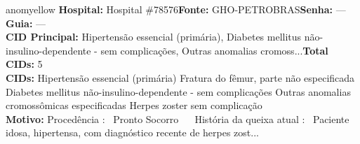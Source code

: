 \documentclass[a4paper,10pt]{article}
\begin{document}
\begin{anomalycard}[Interna\c{c}\~{a}o \#167734 | Pac. \#32192 | MODERADO (z=2.26) | LOS: 18d | 05/03/2026\,$\to$\,—]{anomyellow}
\textbf{Hospital:} Hospital \#78576\quad \textbf{Fonte:} GHO-PETROBRAS\quad \textbf{Senha:} ---\quad \textbf{Guia:} ---\\

\textbf{CID Principal:} {\small Hipertensão essencial (primária), Diabetes mellitus não-insulino-dependente - sem complicações, Outras anomalias cromoss...}\quad\textbf{Total CIDs:} 5\\

\textbf{CIDs:} {\scriptsize Hipertensão essencial (primária) \textbar{} Fratura do fêmur, parte não especificada \textbar{} Diabetes mellitus não-insulino-dependente - sem complicações \textbar{} Outras anomalias cromossômicas especificadas \textbar{} Herpes zoster sem complicação}\\

\textbf{Motivo:} {\scriptsize Procedência :  Pronto Socorro     História da queixa atual :  Paciente idosa, hipertensa, com diagnóstico recente de herpes zost...}\\




\end{anomalycard}
\end{document}
